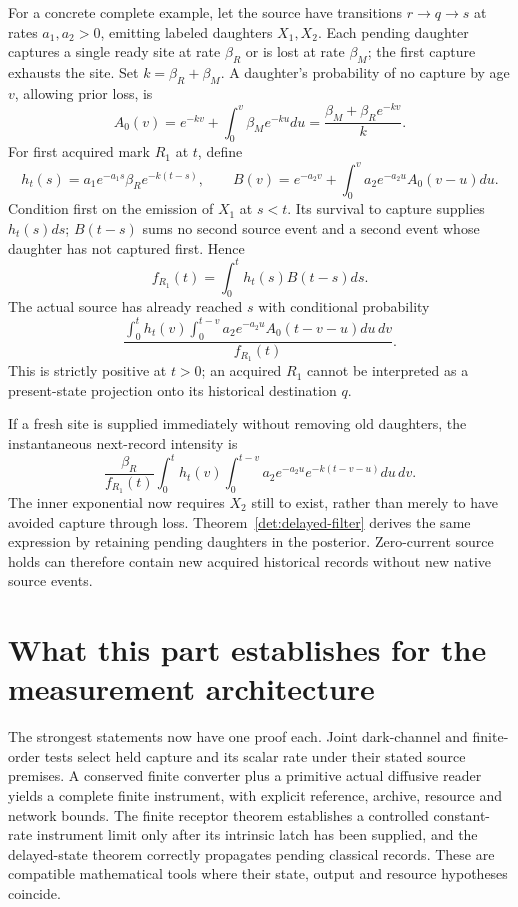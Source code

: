 \documentclass[11pt,oneside,openany]{book}
\theoremstyle{definition}
\theoremstyle{remark}\newtheorem{remark}[theorem]{Remark}
\begin{document}
For a concrete complete example, let the source have transitions
$r\to q\to s$ at rates $a_1,a_2>0$, emitting labeled daughters
$X_1,X_2$. Each pending daughter captures a single ready site at rate
$\beta_R$ or is lost at rate $\beta_M$; the first capture exhausts
the site. Set $k=\beta_R+\beta_M$. A daughter's probability of no
capture by age $v$, allowing prior loss, is
\[
 A_0(v)=e^{-kv}+\int_0^v\beta_Me^{-ku}du
       =\frac{\beta_M+\beta_Re^{-kv}}{k}.
\]
For first acquired mark $R_1$ at $t$, define
\[
 h_t(s)=a_1e^{-a_1s}\beta_Re^{-k(t-s)},\qquad
 B(v)=e^{-a_2v}+\int_0^v a_2e^{-a_2u}A_0(v-u)du.
\]
Condition first on the emission of $X_1$ at $s<t$. Its survival to
capture supplies $h_t(s)ds$; $B(t-s)$ sums no second source event
and a second event whose daughter has not captured first. Hence
\begin{equation}
 f_{R_1}(t)=\int_0^th_t(s)B(t-s)ds.             \label{det:delayed-density}
\end{equation}
The actual source has already reached $s$ with conditional probability
\begin{equation}
 \frac{\displaystyle\int_0^th_t(v)
          \int_0^{t-v}a_2e^{-a_2u}A_0(t-v-u)du\,dv}
      {f_{R_1}(t)}.                             \label{det:delayed-posterior}
\end{equation}
This is strictly positive at $t>0$; an acquired $R_1$ cannot be
interpreted as a present-state projection onto its historical
destination $q$.

If a fresh site is supplied immediately without removing old daughters,
the instantaneous next-record intensity is
\begin{equation}
 \frac{\beta_R}{f_{R_1}(t)}\int_0^th_t(v)
       \int_0^{t-v}a_2e^{-a_2u}e^{-k(t-v-u)}du\,dv.            \label{det:pending-rate}
\end{equation}
The inner exponential now requires $X_2$ still to exist, rather than
merely to have avoided capture through loss. Theorem~\ref{det:delayed-filter}
derives the same expression by retaining pending daughters in the
posterior. Zero-current source holds can therefore contain new
acquired historical records without new native source events.

\section{What this part establishes for the measurement architecture}

The strongest statements now have one proof each. Joint dark-channel
and finite-order tests select held capture and its scalar rate under
their stated source premises. A conserved finite converter plus a
primitive actual diffusive reader yields a complete finite instrument,
with explicit reference, archive, resource and network bounds. The
finite receptor theorem establishes a controlled constant-rate
instrument limit only after its intrinsic latch has been supplied,
and the delayed-state theorem correctly propagates pending classical
records. These are compatible mathematical tools where their state,
output and resource hypotheses coincide.
\end{document}
